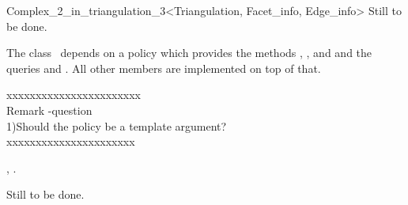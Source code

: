 \begin{ccRefClass}{Complex_2_in_triangulation_3<Triangulation, Facet_info, Edge_info>}
Still to be done.

\ccImplementation
The class \ccRefName\ depends on a policy which provides the 
methods
, ,  and 
and the queries  and 
.
All other members are implemented on top of that.

xxxxxxxxxxxxxxxxxxxxxxx \\
Remark -question \\
1)Should the policy be a template argument? \\
xxxxxxxxxxxxxxxxxxxxxx \\


\ccSeeAlso

,
.

\ccExample
Still to be done.



\end{ccRefClass}


